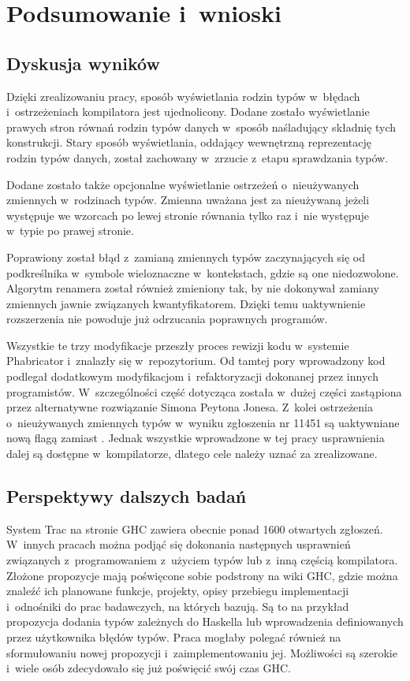\chapter{Podsumowanie i~wnioski}\label{chap:podsumowanie}

\section{Dyskusja wyników}

Dzięki zrealizowaniu pracy, sposób wyświetlania rodzin typów w~błędach
i~ostrzeżeniach kompilatora jest ujednolicony. Dodane zostało wyświetlanie prawych
stron równań rodzin typów danych w~sposób naśladujący składnię tych
konstrukcji. Stary sposób wyświetlania, oddający wewnętrzną reprezentację
rodzin typów danych, został zachowany w~zrzucie z~etapu sprawdzania typów.

Dodane zostało także opcjonalne wyświetlanie ostrzeżeń o~nieużywanych zmiennych
w~rodzinach typów. Zmienna uważana jest za nieużywaną jeżeli występuje we
wzorcach po lewej stronie równania tylko raz i~nie występuje w~typie po prawej
stronie.

Poprawiony został błąd z~zamianą zmiennych typów zaczynających się od
podkreślnika w~symbole wieloznaczne w~kontekstach, gdzie są one
niedozwolone. Algorytm renamera został również zmieniony tak, by nie dokonywał
zamiany zmiennych jawnie związanych kwantyfikatorem. Dzięki temu uaktywnienie
rozszerzenia  nie powoduje już odrzucania poprawnych programów.

Wszystkie te trzy modyfikacje przeszły proces rewizji kodu w~systemie
Phabricator i~znalazły się w~repozytorium. Od tamtej pory wprowadzony kod
podlegał dodatkowym modyfikacjom i~refaktoryzacji dokonanej przez innych
programistów. W~szczególności część dotycząca  została
w~dużej części zastąpiona przez alternatywne rozwiązanie Simona
Peytona Jonesa. Z~kolei ostrzeżenia o~nieużywanych zmiennych typów w~wyniku
zgłoszenia nr 11451 są uaktywniane nową flagą 
zamiast .
Jednak wszystkie wprowadzone w tej pracy usprawnienia dalej są dostępne
w~kompilatorze, dlatego cele należy uznać za zrealizowane.

\section{Perspektywy dalszych badań}
System Trac na stronie GHC zawiera obecnie ponad 1600 otwartych
zgłoszeń\cite{WikiTickets}. W~innych pracach można podjąć się dokonania następnych
usprawnień związanych z~programowaniem z~użyciem typów lub z~inną częścią
kompilatora. Złożone propozycje mają poświęcone sobie podstrony na wiki GHC,
gdzie można znaleźć ich planowane funkcje, projekty, opisy przebiegu
implementacji i~odnośniki do prac badawczych, na których bazują. Są to na
przykład propozycja dodania typów zależnych do Haskella lub wprowadzenia
definiowanych przez użytkownika błędów typów. Praca mogłaby polegać również na
sformułowaniu nowej propozycji i~zaimplementowaniu jej. Możliwości są szerokie
i~wiele osób zdecydowało się już poświęcić swój czas GHC.
